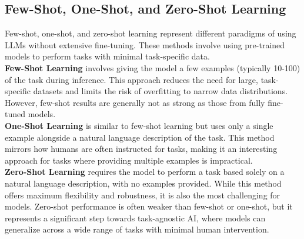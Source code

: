 \subsection{Few-Shot, One-Shot, and Zero-Shot Learning}
Few-shot, one-shot, and zero-shot learning represent different paradigms of using LLMs without extensive fine-tuning. These methods involve using pre-trained models to perform tasks with minimal task-specific data.\\
\textbf{Few-Shot Learning} involves giving the model a few examples (typically 10-100) of the task during inference. This approach reduces the need for large, task-specific datasets and limits the risk of overfitting to narrow data distributions. However, few-shot results are generally not as strong as those from fully fine-tuned models.\\
\textbf{One-Shot Learning} is similar to few-shot learning but uses only a single example alongside a natural language description of the task. This method mirrors how humans are often instructed for tasks, making it an interesting approach for tasks where providing multiple examples is impractical.\\
\textbf{Zero-Shot Learning} requires the model to perform a task based solely on a natural language description, with no examples provided. While this method offers maximum flexibility and robustness, it is also the most challenging for models. Zero-shot performance is often weaker than few-shot or one-shot, but it represents a significant step towards task-agnostic AI, where models can generalize across a wide range of tasks with minimal human intervention\cite{brown2020language}.
